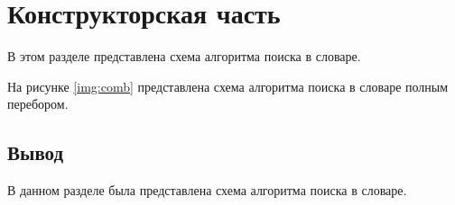 
\chapter{Конструкторская часть}
В этом разделе представлена схема алгоритма поиска в словаре.

На рисунке \ref{img:comb} представлена схема алгоритма поиска в словаре полным перебором.


\section*{Вывод}
В данном разделе была представлена схема алгоритма поиска в словаре.